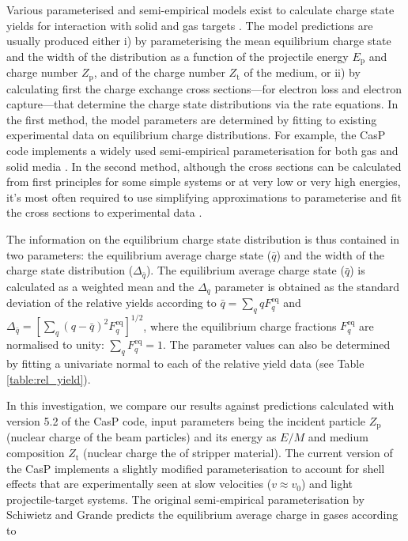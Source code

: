 \documentclass[a4paper,fleqn,review]{cas-sc}
\begin{document}
Various parameterised and semi-empirical models exist to calculate charge state yields for interaction with solid and gas targets \cite{schiwietz2001improved, schiwietz2004femtosecond}. The model predictions are usually produced either i) by parameterising the mean equilibrium charge state and the width of the distribution as a function of the projectile energy $E_\text{p}$ and charge number $Z_\text{p}$, and of the charge number $Z_\text{t}$ of the medium, or ii) by
calculating first the charge exchange cross sections---for electron loss and electron capture---that determine the charge state distributions via the rate equations. In the first method, the model parameters are determined by fitting to existing experimental data on equilibrium charge distributions. For example, the CasP code implements a widely used semi-empirical parameterisation for both gas and solid media \cite{schiwietz2001improved}. In the second method, although the cross sections can be calculated from first principles for some simple systems or at very low or very high energies, it's most often required to use simplifying approximations to parameterise and fit the cross sections to experimental data \cite{Friedman-duCharme2017}. 

The information on the equilibrium charge state distribution is thus contained in two parameters: the equilibrium average charge state ($\bar{q}$) and the width of the charge state distribution ($\Delta_{\bar{q}}$).
The equilibrium average charge state ($\bar{q}$) is calculated as a weighted mean and the $\Delta_{q}$ parameter  is obtained as the standard deviation of the relative yields according to \(\bar{q} = \sum_q qF_q^\text{eq}\) and \(\Delta_{\bar{q}} = \left[\sum_q \left(q- \bar{q}  \right)^2 F_q^\text{eq}\right]^{1/2}\), where the equilibrium charge fractions $F_q^\text{eq}$ are normalised to unity: $\sum_q F_q^\text{eq} = 1$. The parameter values can also be determined by fitting a univariate normal to each of the relative yield data (see Table \ref{table:rel_yield}).


In this investigation, we compare our results against predictions calculated with version 5.2 of the CasP code, input parameters being the incident particle $Z_\text{p}$ (nuclear charge of the beam particles) and its energy as $E/M$ and medium composition $Z_\text{t}$ (nuclear charge the of stripper material). The current version of the CasP implements a slightly modified parameterisation to account for shell effects that are experimentally seen at slow velocities ($v\approx v_0$) and light projectile-target systems. 
The original semi-empirical parameterisation by Schiwietz and Grande \cite{schiwietz2001improved} predicts the equilibrium average charge in gases according to
\end{document}
